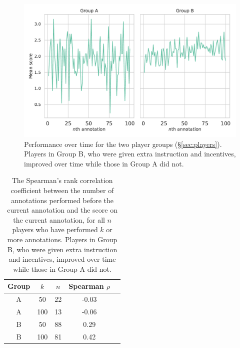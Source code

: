 \begin{figure}[tb]
    \centering
    \includegraphics[scale=0.375]{figures/overtime.pdf}
    \caption{Performance over time for the two player groups (\S\ref{sec:players}). Players in Group B, who were given extra instruction and incentives, improved over time while those in Group A did not.}
    \label{fig:skill_over_time}
\end{figure}

\begin{table}[tb]
\small
\centering
\begin{tabular}{SSSSS} \toprule
    {Group} & {$k$} & {$n$} & {Spearman $\rho$}\\ \midrule
    {A} & {50} & {22} & {-0.03} \\
    {A} & {100} & {13} & {-0.06}  \\
    \midrule
    {B} & {50} & {88} & {0.29} \\
    {B} & {100} & {81} & {0.42} \\
    \bottomrule
\end{tabular}
\caption{The Spearman's rank correlation coefficient between the number of annotations performed before the current annotation and the score on the current annotation, for all $n$ players who have performed $k$ or more annotations. Players in Group B, who were given extra instruction and incentives, improved over time while those in Group A did not.}
\label{tab:correlation_over_time}
\end{table}


